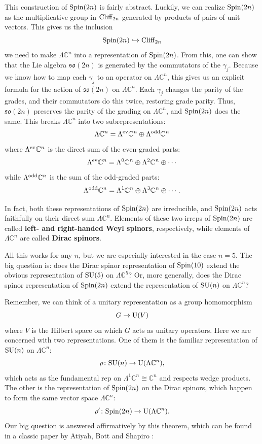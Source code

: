 \documentclass{article}
\newcommand{\maps}{\colon}    %
\newcommand{\C}{{\mathbb C}}  %
\newcommand{\U}{{\rm U}}    %
\newcommand{\SU}{{\rm SU}}    %
\newcommand{\Spin}{{\rm Spin}}    %
\newcommand{\so}{{\mathfrak{so}}}  %
\newcommand{\Ex}{\Lambda} %
\newcommand{\Exev}{\Lambda^{\rm ev}} %
\newcommand{\Exodd}{\Lambda^{\rm odd}} %
\newcommand{\Cliff}{{\rm Cliff}}    %
\newcommand{\inclusion}{\hookrightarrow}
\newcommand{\iso}{\cong} %
\newcommand{\define}[1]{{\bf #1}}
\begin{document}
This construction of $\Spin(2n)$ is fairly abstract.  Luckily, we can realize
$\Spin(2n)$ as the multiplicative group in $\Cliff_{2n}$ generated by products
of pairs of unit vectors.  This gives us the inclusion
\[ \Spin(2n) \inclusion \Cliff_{2n} \]
we need to make $\Ex \C^n$ into a representation of $\Spin(2n)$. 
From this, one can show that the Lie algebra $\so(2n)$ is 
generated by the commutators of the $\gamma_j$.  Because we know
how to map each $\gamma_j$ to an operator on $\Ex \C^n$, 
this gives us an explicit formula for the action of $\so(2n)$ on $\Ex \C^n$. 
Each $\gamma_j$
changes the parity of the grades, and their commutators do this twice,
restoring grade parity.  Thus, $\so(2n)$ preserves the parity of the grading on
$\Ex \C^n$, and $\Spin(2n)$ does the same.  This breaks $\Ex \C^n$ into
two subrepresentations:
\[	\Ex \C^n = \Exev \C^n  \oplus \Exodd \C^n	\]
where $\Exev \C^n$ is the direct sum of the even-graded parts:
\[	\Exev \C^n = \Ex^0 \C^n \oplus \Ex^2 \C^n \oplus \cdots	\]
while $\Exodd \C^n$ is the sum of the odd-graded parts:
\[	\Exodd \C^n = \Ex^1 \C^n \oplus \Ex^3 \C^n \oplus \cdots. \]

In fact, both these representations of $\Spin(2n)$ are irreducible, and
$\Spin(2n)$ acts faithfully on their direct sum $\Ex \C^n$. Elements of these
two irreps of $\Spin(2n)$ are called \define{left- and right-handed 
Weyl spinors}, respectively, while elements of $\Ex \C^n$ are called 
\define{Dirac spinors}.

All this works for any $n$, but we are especially interested in the 
case $n=5$.  The big question is: does the Dirac spinor representation of 
$\Spin(10)$ extend the obvious representation of $\SU(5)$ on $\Ex \C^5$?
Or, more generally, does the Dirac spinor representation of $\Spin(2n)$ 
extend the representation of $\SU(n)$ on $\Ex \C^n$?

Remember, we can think of a unitary representation as a group homomorphism
\[ G \to \U(V) \]
where $V$ is the Hilbert space on which $G$ acts as unitary operators.
Here we are concerned with two representations. One of them is the familiar
representation of $\SU(n)$ on $\Ex \C^n$:
\[ \rho \maps \SU(n) \to \U(\Ex \C^n), \]
which acts as the fundamental rep 
on $\Ex^1 \C^n \iso \C^n$ and respects wedge
products. The other is the representation of $\Spin(2n)$ on
the Dirac spinors, which happen to form the same vector space $\Ex \C^n$:
\[ \rho' \maps \Spin(2n) \to \U(\Ex \C^n). \]
Our big question is answered affirmatively by this theorem, which
can be found in a classic paper by Atiyah, Bott and Shapiro
\cite{ABS}:
\end{document}
